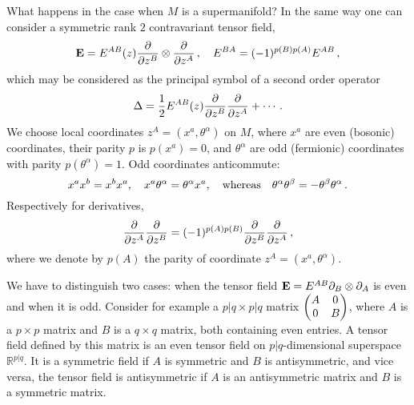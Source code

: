 \documentclass[12pt,reqno,a4paper]{amsart}
\theoremstyle{definition}
\begin{document}
What happens in the case when $M$ is a supermanifold? In the same way one
can consider a symmetric rank $2$ contravariant tensor field,
              \begin{equation*}
     {{\bf E}}=E^{AB}(z){{\partial}\over {\partial} z^B}\otimes{{\partial}\over {\partial} z^A}\,,\quad
               E^{BA}=(-1)^{p(B)p(A)}E^{AB}\,,
                   \end{equation*}
which may be considered as the principal symbol of a second order operator
                   \begin{equation*}
  \Delta={1\over 2}E^{AB}(z){{\partial}\over {\partial} z^B}{{\partial}\over {\partial} z^A}+\cdots\,.
                     \end{equation*}
We choose local coordinates $z^A=(x^a,\theta^{\alpha})$ on $M$, where
$x^a$ are even (bosonic) coordinates, their parity $p$ is $p(x^a)=0$,
 and $\theta^{\alpha}$ are odd (fermionic) coordinates
with parity $p(\theta^{\alpha})=1$. Odd coordinates
anticommute:
             \begin{equation*}
x^ax^b=x^bx^a,\quad x^a\theta^{\alpha}=\theta^{\alpha} x^a,\quad {\rm whereas}\quad
 \theta^{\alpha}\theta^{\beta}=-\theta^{\beta}\theta^{\alpha}\,.
             \end{equation*}
Respectively for derivatives,
                \begin{equation}\label{signrule1}
 {{\partial}\over {\partial} z^A}{{\partial}\over {\partial} z^B}=(-1)^{p(A)p(B)}
            {{\partial}\over {\partial} z^B}{{\partial}\over {\partial} z^A}\,,
               \end{equation}
where we denote by $p(A)$ the parity of coordinate $z^A=(x^a,\theta^{\alpha})$.

 We  have to distinguish two cases: when the tensor field
${{\bf E}}=E^{AB}{\partial}_B\otimes{\partial}_A$
 is even and when it is odd. Consider for example
a $p|q\times p|q$ matrix
                 $
       \begin {pmatrix}
          A& 0\cr 0& B
       \end {pmatrix}
                 $,
where $A$ is a $p\times p$ matrix and $B$ is a $q\times q$ matrix, both containing
even entries. A tensor field defined by this matrix is an even tensor field on
$p|q$-dimensional superspace ${\mathbb{R}}^{p|q}$. It is a symmetric field  if $A$ is
symmetric and $B$ is antisymmetric, and vice versa, the tensor field is
antisymmetric if $A$ is an antisymmetric matrix and $B$ is a symmetric matrix.
\end{document}
